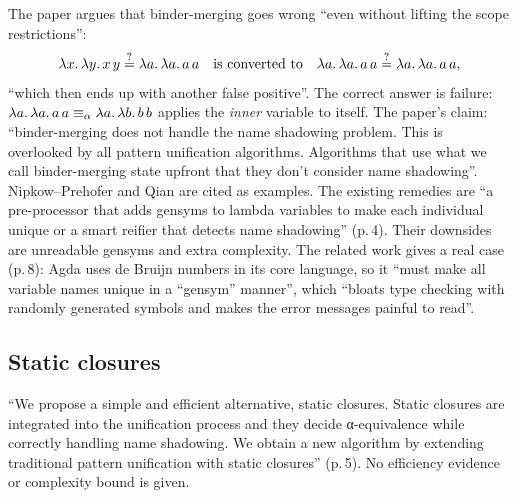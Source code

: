 The paper argues that binder-merging goes wrong \enquote{even without lifting the scope
restrictions}:
\[
  \lambda x.\,\lambda y.\,x\,y \stackrel{?}{=} \lambda a.\,\lambda a.\,a\,a
  \quad\text{is converted to}\quad
  \lambda a.\,\lambda a.\,a\,a \stackrel{?}{=} \lambda a.\,\lambda a.\,a\,a,
\]
\enquote{which then ends up with another false positive}. The correct answer is failure:
$\lambda a.\,\lambda a.\,a\,a\equiv_\alpha\lambda a.\,\lambda b.\,b\,b$ applies the \emph{inner} variable to itself.
The paper's claim: \enquote{binder-merging does not handle the name shadowing problem. This is
overlooked by all pattern unification algorithms. Algorithms that use what we call binder-merging state
upfront that they don't consider name shadowing}. Nipkow--Prehofer and Qian are cited as examples. The
existing remedies are \enquote{a pre-processor that adds gensyms to lambda variables to make each
individual unique or a smart reifier that detects name shadowing} (p.\,4). Their downsides are
unreadable gensyms and extra complexity. The related work gives a real case (p.\,8): Agda uses de Bruijn
numbers in its core language, so it \enquote{must make all variable names unique in a “gensym” manner},
which \enquote{bloats type checking with randomly generated symbols and makes the error messages painful to
read}.

\subsection{Static closures}\label{sec:lkanren-static}

\enquote{We propose a simple and efficient alternative, static closures. Static closures are
integrated into the unification process and they decide α-equi\-va\-lence while correctly handling name
shadowing. We obtain a new algorithm by extending traditional pattern unification with static
closures} (p.\,5). No efficiency evidence or complexity bound is given.

